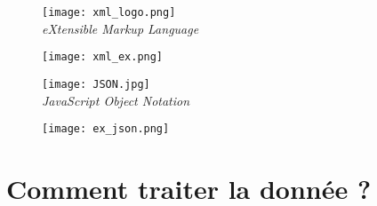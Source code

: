 \documentclass{beamer}
\theoremstyle{definition}
\begin{document}
\begin{frame}
	
	\begin{minipage}[c]{1\linewidth}
		\begin{minipage}[c]{0.2\linewidth}
			\begin{figure}
				
				\texttt{[image: xml\_logo.png]}\\[0.25cm]
				\emph{eXtensible Markup Language}
				
			\end{figure}
		\end{minipage}\hfil
		\begin{minipage}[c]{0.6\linewidth}
			\begin{figure}
				\centering
				\texttt{[image: xml\_ex.png]}
			\end{figure}
		\end{minipage}
	\end{minipage}
\end{frame}

\begin{frame}
	
	\begin{minipage}[c]{1\linewidth}
		\begin{minipage}[c]{0.2\linewidth}
			\begin{figure}
				
				\texttt{[image: JSON.jpg]}\\[0.25cm]
				\emph{JavaScript Object Notation}
				
			\end{figure}
		\end{minipage}\hfil
		\begin{minipage}[c]{0.6\linewidth}
			\begin{figure}
				\centering
				\texttt{[image: ex\_json.png]}
			\end{figure}
		\end{minipage}
	\end{minipage}
\end{frame}

\section{Comment traiter la donnée ?}
\end{document}
